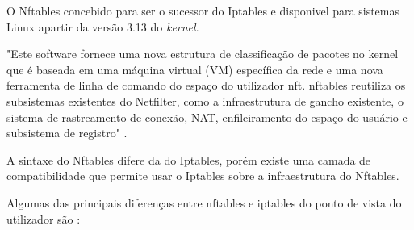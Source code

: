 O Nftables \cite{nftables} concebido para ser o sucessor do Iptables e disponivel para sistemas 
Linux apartir da versão 3.13 do \textit{kernel}.

"Este software fornece uma nova estrutura de classificação de pacotes no kernel 
que é baseada em uma máquina virtual (VM) específica da rede e uma nova ferramenta 
de linha de comando do espaço do utilizador nft. nftables reutiliza os subsistemas 
existentes do Netfilter, como a infraestrutura de gancho existente, o sistema de 
rastreamento de conexão, NAT, enfileiramento do espaço do usuário e subsistema de 
registro" \cite{nftables}.

A sintaxe do Nftables difere da do Iptables, porém existe uma camada de 
compatibilidade que permite usar o Iptables sobre a infraestrutura do Nftables.


Algumas das principais diferenças entre nftables e iptables do ponto de vista do 
utilizador são \cite{diffiptenft}:

